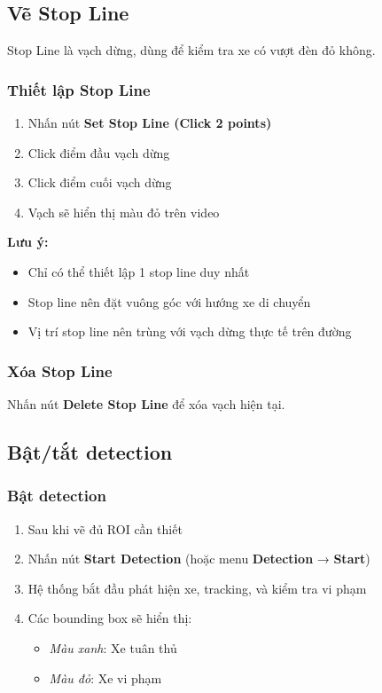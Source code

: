 \subsection{Vẽ Stop Line}

Stop Line là vạch dừng, dùng để kiểm tra xe có vượt đèn đỏ không.

\subsubsection{Thiết lập Stop Line}
\begin{enumerate}
    \item Nhấn nút \textbf{Set Stop Line (Click 2 points)}
    \item Click điểm đầu vạch dừng
    \item Click điểm cuối vạch dừng
    \item Vạch sẽ hiển thị màu đỏ trên video
\end{enumerate}

\textbf{Lưu ý:}
\begin{itemize}
    \item Chỉ có thể thiết lập 1 stop line duy nhất
    \item Stop line nên đặt vuông góc với hướng xe di chuyển
    \item Vị trí stop line nên trùng với vạch dừng thực tế trên đường
\end{itemize}

\subsubsection{Xóa Stop Line}
Nhấn nút \textbf{Delete Stop Line} để xóa vạch hiện tại.

\subsection{Bật/tắt detection}

\subsubsection{Bật detection}
\begin{enumerate}
    \item Sau khi vẽ đủ ROI cần thiết
    \item Nhấn nút \textbf{Start Detection} (hoặc menu \textbf{Detection} → \textbf{Start})
    \item Hệ thống bắt đầu phát hiện xe, tracking, và kiểm tra vi phạm
    \item Các bounding box sẽ hiển thị:
    \begin{itemize}
        \item \textit{Màu xanh}: Xe tuân thủ
        \item \textit{Màu đỏ}: Xe vi phạm
    \end{itemize}
\end{enumerate}

